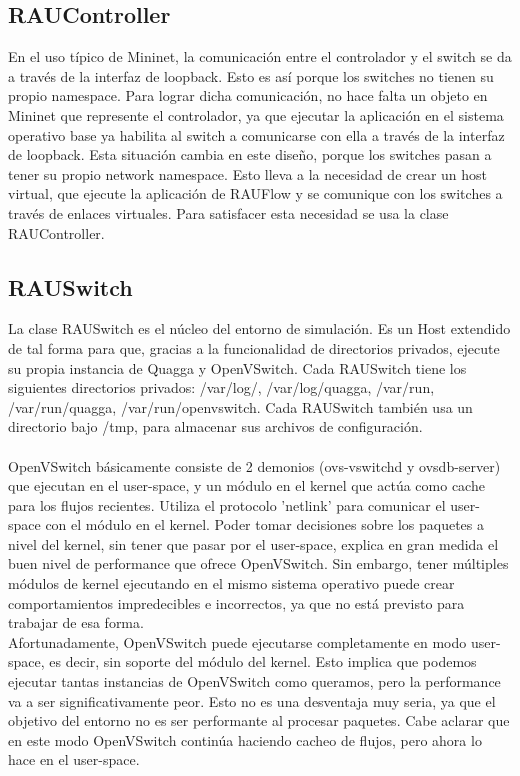 \subsection{RAUController}
En el uso típico de Mininet, la comunicación entre el controlador y el switch se da a través de la interfaz de loopback. Esto es así porque los switches no tienen su propio namespace. Para lograr dicha comunicación, no hace falta un objeto en Mininet que represente el controlador, ya que ejecutar la aplicación en el sistema operativo base ya habilita al switch a comunicarse con ella a través de la interfaz de loopback. Esta situación cambia en este diseño, porque los switches pasan a tener su propio network namespace. Esto lleva a la necesidad de crear un host virtual, que ejecute la aplicación de RAUFlow y se comunique con los switches a través de enlaces virtuales. Para satisfacer esta necesidad se usa la clase RAUController.

\subsection{RAUSwitch}
La clase RAUSwitch es el núcleo del entorno de simulación. Es un Host extendido de tal forma para que, gracias a la funcionalidad de directorios privados, ejecute su propia instancia de Quagga y OpenVSwitch. Cada RAUSwitch tiene los siguientes directorios privados: /var/log/, /var/log/quagga, /var/run, /var/run/quagga, /var/run/openvswitch. Cada RAUSwitch también usa un directorio bajo /tmp, para almacenar sus archivos de configuración.\\ \\

OpenVSwitch básicamente consiste de 2 demonios (ovs-vswitchd y ovsdb-server) que ejecutan en el user-space, y un módulo en el kernel que actúa como cache para los flujos recientes. Utiliza el protocolo 'netlink' para comunicar el user-space con el módulo en el kernel. Poder tomar decisiones sobre los paquetes a nivel del kernel, sin tener que pasar por el user-space, explica en gran medida el buen nivel de performance que ofrece OpenVSwitch. Sin embargo, tener múltiples módulos de kernel ejecutando en el mismo sistema operativo puede crear comportamientos impredecibles e incorrectos, ya que no está previsto para trabajar de esa forma.\\
Afortunadamente, OpenVSwitch puede ejecutarse completamente en modo user-space, es decir, sin soporte del módulo del kernel. Esto implica que podemos ejecutar tantas instancias de OpenVSwitch como queramos, pero la performance va a ser significativamente peor. Esto no es una desventaja muy seria, ya que el objetivo del entorno no es ser performante al procesar paquetes. Cabe aclarar que en este modo OpenVSwitch continúa haciendo cacheo de flujos, pero ahora lo hace en el user-space.

